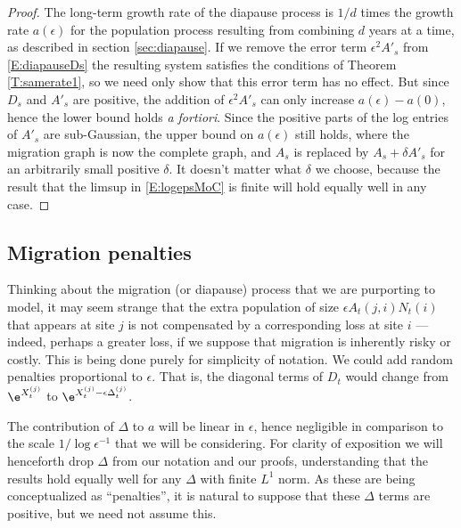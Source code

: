\documentclass[11pt]{amsart}
\begin{document}
\begin{proof}
	The long-term growth rate of the diapause process is $1/d$ times the growth rate $a(\epsilon)$ for the population process resulting from combining $d$ years at a time, as described in section \ref{sec:diapause}.
	If we remove the error term $\epsilon^2 A'_s$ from \eqref{E:diapauseDs} the resulting system satisfies the conditions of Theorem \ref{T:samerate1}, so we need only show that this error term has no effect.
	But since $D_s$ and $A'_s$ are positive, the addition of $\epsilon^2 A'_s$ can only increase $a(\epsilon)-a(0)$, hence the lower bound holds {\em a fortiori}.
	Since the positive parts of the log entries of $A'_s$ are sub-Gaussian, the upper bound on $a(\epsilon)$ still holds, where the migration graph is now the complete graph, and $A_s$ is replaced by $A_s+\delta A'_s$ for an arbitrarily small positive $\delta$.
	It doesn't matter what $\delta$ we choose, because the result that the limsup in \eqref{E:logepsMoC} is finite will hold equally well in any case.
\end{proof}

\subsection{Migration penalties}
Thinking about the migration (or diapause) process that we are purporting to model, it may seem strange that the extra population of size $\epsilon A_t(j,i)N_t(i)$ that appears at site $j$ is not compensated by a corresponding loss at site $i$ --- indeed, perhaps a greater loss, if we suppose that migration is inherently risky or costly.
This is being done purely for simplicity of notation.
We could add random penalties  %
proportional to $\epsilon$.
That is, the diagonal terms of $D_t$ would change from $\e^{X_t^{(j)}}$ to $\e^{X_t^{(j)} - \epsilon \Delta_t^{(j)}}$.

The contribution of $\Delta$ to $a$ will
be linear in $\epsilon$, hence negligible in comparison
to the scale $1/\log\epsilon^{-1}$ that we will be
considering. 
For clarity of exposition we will henceforth drop $\Delta$ from
our notation and our proofs, understanding that the
results hold equally well for any $\Delta$ with finite $L^1$ norm.
As these are being conceptualized as ``penalties'', it is natural to suppose that these $\Delta$ terms are positive, but we need not assume this.
\end{document}
